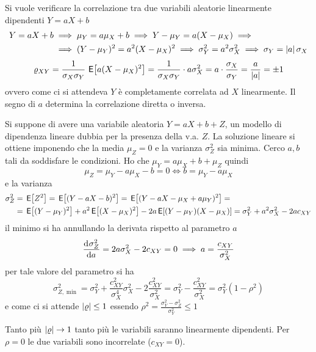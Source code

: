 \begin{esempio}
Si vuole verificare la correlazione tra due variabili aleatorie linearmente dipendenti $Y=a X+b$
\[\begin{split}Y=a X+b&\implies\mu_Y=a\mu_X+b\implies Y-\mu_Y=a(X-\mu_X)\implies\\&\implies(Y-\mu_Y)^2=a^2(X-\mu_X)^2\implies\sigma^2_Y=a^2\sigma^2_X\implies\sigma_Y=\left|{a}\right|\sigma_X\end{split}\]
\[\varrho_{XY}=\frac{1}{\sigma_X\sigma_Y}\,\,{\operatorname{\mathsf{E}}}\!\left[{a(X-\mu_X)^2}\right]=\frac{1}{\sigma_X\sigma_Y}\cdot a\sigma^2_X=a\cdot\frac{\sigma_X}{\sigma_Y}=\frac{a}{\left|{a}\right|}=\pm 1\]
ovvero come ci si attendeva $Y$ è completamente correlata ad $X$ linearmente. Il segno di $a$ determina la correlazione diretta o inversa.
\end{esempio}

\begin{esempio}
Si suppone di avere una variabile aleatoria $Y=a X+b+Z$, un modello di dipendenza lineare dubbia per la presenza della v.a. $Z$. La soluzione lineare si ottiene imponendo che la media $\mu_Z=0$ e la varianza $\sigma^2_Z$ sia minima. Cerco $a,b$ tali da soddisfare le condizioni.
Ho che $\mu_Y=a\mu_X+b+\mu_Z$ quindi \[\mu_Z=\mu_Y-a\mu_X-b=0\iff b=\mu_Y-a\mu_X\]
e la varianza 
\[\begin{split}\sigma^2_Z&=\,{\operatorname{\mathsf{E}}}\!\left[{Z^2}\right]=\,{\operatorname{\mathsf{E}}}\!\left[{(Y-a X-b)^2}\right]=\,{\operatorname{\mathsf{E}}}\!\left[{(Y-a X-\mu_X+a\mu_Y)^2}\right]=\\&=\,{\operatorname{\mathsf{E}}}\!\left[{(Y-\mu_Y)^2}\right]+a^2 \,{\operatorname{\mathsf{E}}}\!\left[{(X-\mu_X)^2}\right]-2a \,{\operatorname{\mathsf{E}}}\!\left[{(Y-\mu_Y)(X-\mu_X)}\right]=\sigma^2_Y+a^2\sigma^2_X-2a c_{XY}\end{split}\]
il minimo si ha annullando la derivata rispetto al parametro $a$
\[\dfrac{\mathop{}\!\mathrm{d}^{}\sigma^2_Z}{\mathop{}\!\mathrm{d} a^{}}=2a\sigma^2_X-2c_{XY}=0 \implies a=\frac{c_{XY}}{\sigma^2_X}\]
per tale valore del parametro si ha
\[\sigma^2_{Z,\min}=\sigma^2_Y+\frac{c^2_{XY}}{\sigma^4_X}\sigma^2_X-2\frac{c^2_{XY}}{\sigma^2_X}=\sigma^2_Y-\frac{c^2_{XY}}{\sigma^2_X}=\sigma^2_Y(1-\rho^2)\]
e come ci si attende $\left|{\varrho}\right|\leq 1$ essendo $\rho^2=\frac{\sigma^2_Y-\sigma^2_Z}{\sigma^2_Y}\leq 1$

Tanto più $\left|{\varrho}\right|\to 1$ tanto più le variabili saranno linearmente dipendenti. Per $\rho=0$ le due variabili sono incorrelate ($c_{XY}=0$).
\end{esempio}

